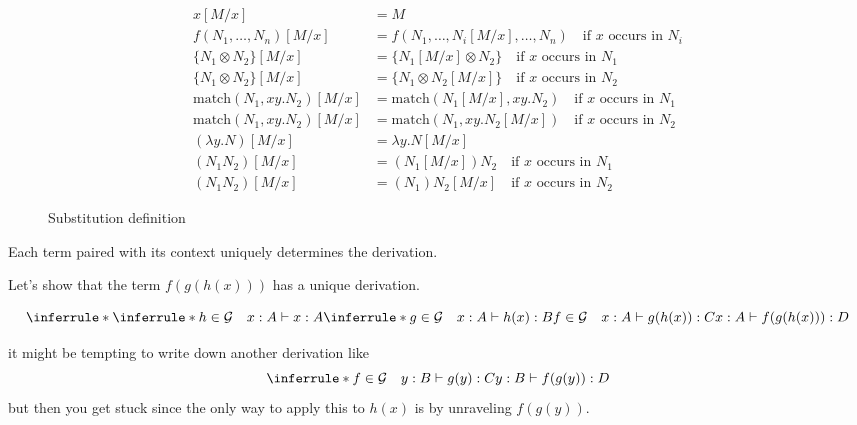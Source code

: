 \documentclass[acmsmall,screen, nonacm, anonymous]{acmart}
\begin{document}
\begin{figure}
\begin{align*}
x[M/x] &= M\\
f(N_1, \ldots, N_n)[M/x] &= f(N_1, \ldots, N_i[M/x], \ldots, N_n) \quad \text{if $x$ occurs in $N_i$}\\
\{N_1 \otimes N_2\}[M/x] &= \{N_1[M/x] \otimes N_2\} \quad \text{if $x$ occurs in $N_1$}\\
\{N_1 \otimes N_2\}[M/x] &= \{N_1 \otimes N_2[M/x]\} \quad \text{if $x$ occurs in $N_2$}\\
\text{match}(N_1,xy.N_2)[M/x] &= \text{match}(N_1[M/x], xy.N_2) \quad \text{if $x$ occurs in $N_1$}\\
\text{match}(N_1,xy.N_2)[M/x] &= \text{match}(N_1, xy.N_2[M/x]) \quad \text{if $x$ occurs in $N_2$}\\
(\lambda y . N)[M / x] &= \lambda y . N[M/x]\\
(N_1 N_2)[M / x] &= (N_1[M/x])N_2 \quad \text{if $x$ occurs in $N_1$}\\
(N_1 N_2)[M / x] &= (N_1)N_2[M/x] \quad \text{if $x$ occurs in $N_2$}
\end{align*}
\caption{Substitution definition}
\label{fig:sub-def}
\end{figure}

\begin{lemma}

Each term paired with its context uniquely determines the derivation.
\end{lemma}

\begin{example}
Let's show that the term $f(g(h(x)))$ has a unique derivation.

\[
\inferrule*{
  \inferrule*{h \in \mathcal{G} \quad x : A \vdash x : A}{
  \inferrule*{g \in \mathcal{G} \quad x : A \vdash h(x) : B}{f \in \mathcal{G} \quad x : A \vdash g(h(x)) : C}}}
{x : A \vdash f(g(h(x))) : D}
\]

it might be tempting to write down another derivation like
\[
\inferrule*{f \in \mathcal{G} \quad y : B \vdash g(y) : C}{y : B \vdash f(g(y)) : D}
\]
but then you get stuck since the only way to apply this to $h(x)$ is by unraveling $f(g(y))$.
\end{example}
\end{document}
